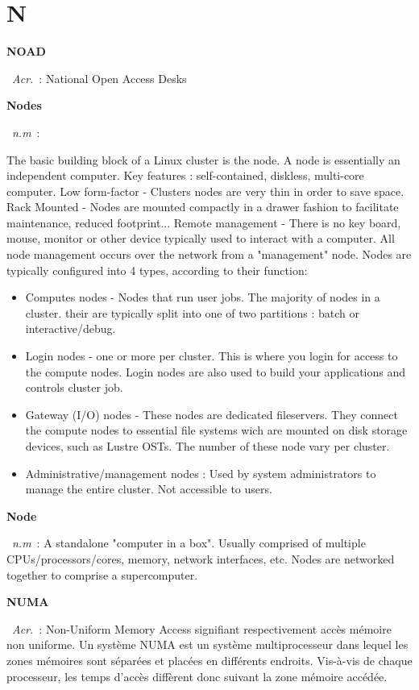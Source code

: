 \documentclass[10pt,a4paper,twoside]{article} %
\newcommand{\entry}[3]{\textbf{#1}\markboth{#1}{#1}\  \textit{#2}\ :  {#3}} %
\begin{document}

\section*{N}

\begin{multicols}{2}

\entry{NOAD}{Acr.}{National Open Access Desks}

\entry{Nodes}{n.m}{The basic building block of a Linux cluster is the node. A node is essentially an independent computer. Key features : self-contained, diskless, multi-core computer. Low form-factor - Clusters nodes are very thin in order to save space. Rack Mounted - Nodes are mounted compactly in a drawer fashion to facilitate maintenance, reduced footprint... Remote management - There is no key board, mouse, monitor or other device typically used to interact with a computer. All node management occurs over the network from a "management" node. 
Nodes are typically configured into 4 types, according to their function:
\begin{itemize}
  \item Computes nodes - Nodes that run user jobs. The majority of nodes in a cluster. their are typically split into one of two partitions : batch or interactive/debug.
  \item Login nodes - one or more per cluster. This is where you login for access to the compute nodes. Login nodes are also used to build your applications and controls cluster job.
  \item Gateway (I/O) nodes - These nodes are dedicated fileservers. They connect the compute nodes to essential file systems wich are mounted on disk storage devices, such as Lustre OSTs. The number of these node vary per cluster.
  \item Administrative/management nodes : Used by system administrators to manage the entire cluster. Not accessible to users.
\end{itemize}}

\entry{Node}{n.m}{A standalone "computer in a box". Usually comprised of multiple CPUs/processors/cores, memory, network interfaces, etc. Nodes are networked together to comprise a supercomputer.}

\entry{NUMA}{Acr.}{Non-Uniform Memory Access signifiant respectivement accès mémoire non uniforme. Un système NUMA est un système multiprocesseur dans lequel les zones mémoires sont séparées et placées en différents endroits. Vis-à-vis de chaque processeur, les temps d'accès diffèrent donc suivant la zone mémoire accédée.}


\end{multicols}
\end{document}
